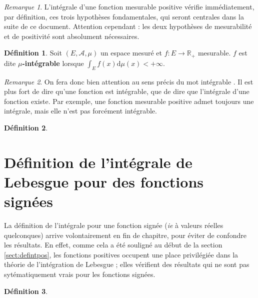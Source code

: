 \documentclass[french]{report}
\theoremstyle{plain}
\theoremstyle{definition}
\newtheorem{defi}{Définition}[section]
\theoremstyle{remark}
\newtheorem{rem}{Remarque}[section]
\begin{document}
\begin{rem}
  L'intégrale d'une fonction mesurable positive vérifie immédiatement, par définition, ces trois hypothèses fondamentales, qui seront centrales dans la suite de ce document.
  Attention cependant : les deux hypothèses de mesurabilité et de positivité sont absolument nécessaires.
\end{rem}

\begin{defi}
  Soit $\left(E,\mathcal{A},\mu\right)$ un espace mesuré et $f:E\rightarrow\mathbb{R}_+$ mesurable.
  $f$ est dite $\mu$\textbf{-intégrable} lorsque $\displaystyle\int_Ef(x)\text{d}\mu(x) < +\infty$.
\end{defi}

\begin{rem}
  On fera donc bien attention au sens précis du mot \og intégrable \fg.
  Il est plus fort de dire qu'une fonction est intégrable, que de dire que l'intégrale d'une fonction existe.
  Par exemple, une fonction mesurable positive admet toujours une intégrale, mais elle n'est pas forcément intégrable.
\end{rem}

\begin{defi}
\end{defi}


\section{Définition de l'intégrale de Lebesgue pour des fonctions signées}

La définition de l'intégrale pour une fonction signée (\textit{ie} à valeurs réelles quelconques) arrive volontairement en fin de chapitre, pour éviter de confondre les résultats.
En effet, comme cela a été souligné au début de la section \ref{sect:defintpos}, les fonctions positives occupent une place privilégiée dans la théorie de l'intégration de Lebesgue ; elles vérifient des résultats qui ne sont pas sytématiquement vrais pour les fonctions signées.


\begin{defi}
\end{defi}
\end{document}
